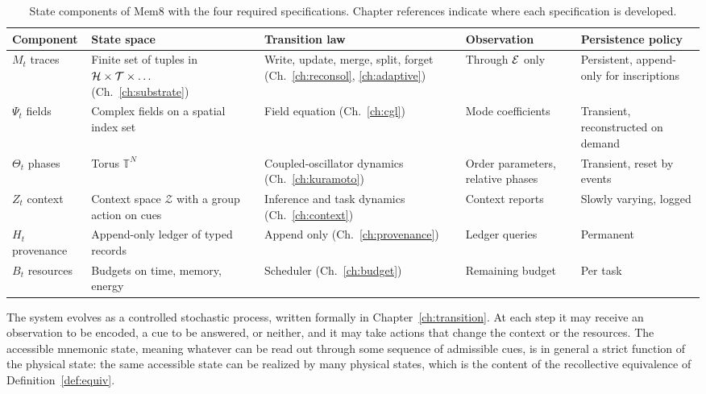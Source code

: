 \begin{table}[t]
\centering
\small
\renewcommand{\arraystretch}{1.25}
\begin{tabularx}{\textwidth}{@{}l>{\raggedright\arraybackslash}X>{\raggedright\arraybackslash}X>{\raggedright\arraybackslash}X>{\raggedright\arraybackslash}X@{}}
\toprule
Component & State space & Transition law & Observation & Persistence policy\\
\midrule
$M_t$ traces & Finite set of tuples in $\mathcal{H}\times\mathcal T\times\dots$ (Ch.~\ref{ch:substrate}) & Write, update, merge, split, forget (Ch.~\ref{ch:reconsol}, \ref{ch:adaptive}) & Through $\mathcal{E}$ only & Persistent, append-only for inscriptions\\
$\Psi_t$ fields & Complex fields on a spatial index set & Field equation (Ch.~\ref{ch:cgl}) & Mode coefficients & Transient, reconstructed on demand\\
$\Theta_t$ phases & Torus $\mathbb T^N$ & Coupled-oscillator dynamics (Ch.~\ref{ch:kuramoto}) & Order parameters, relative phases & Transient, reset by events\\
$Z_t$ context & Context space $\mathcal Z$ with a group action on cues & Inference and task dynamics (Ch.~\ref{ch:context}) & Context reports & Slowly varying, logged\\
$H_t$ provenance & Append-only ledger of typed records & Append only (Ch.~\ref{ch:provenance}) & Ledger queries & Permanent\\
$B_t$ resources & Budgets on time, memory, energy & Scheduler (Ch.~\ref{ch:budget}) & Remaining budget & Per task\\
\bottomrule
\end{tabularx}
\caption{State components of Mem8 with the four required specifications. Chapter references indicate where each specification is developed.}\label{tab:state}
\end{table}

The system evolves as a controlled stochastic process, written formally in Chapter~\ref{ch:transition}. At each step it may receive an observation to be encoded, a cue to be answered, or neither, and it may take actions that change the context or the resources. The accessible mnemonic state, meaning whatever can be read out through some sequence of admissible cues, is in general a strict function of the physical state: the same accessible state can be realized by many physical states, which is the content of the recollective equivalence of Definition~\ref{def:equiv}.

